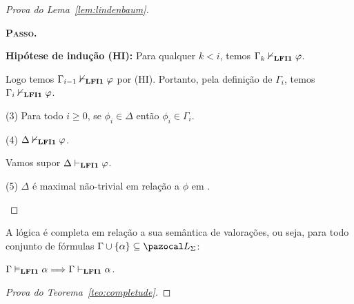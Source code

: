 \begin{proof}[Prova do Lema~\ref{lem:lindenbaum}]
\begin{adjustwidth}{1cm}{}
\begin{adjustwidth}{1cm}{}
                \noindent\textbf{\textsc{Passo.}} 
                
                \noindent\textbf{Hipótese de indução (HI):} Para qualquer $k < i$, temos $\Gamma_k \nvdash_{{\normalfont\textbf{LFI1}}{}} \varphi$.
                
                    Logo temos $\Gamma_{i-1} \nvdash_{{\normalfont\textbf{LFI1}}{}} \varphi$ por (HI). Portanto, pela definição de $\Gamma_i$, temos $\Gamma_i \nvdash_{{\normalfont\textbf{LFI1}}{}} \varphi$.
                    
            \end{adjustwidth}

            
            \noindent(3) Para todo $i \geq 0$, se $\phi_i \in \Delta$ então $\phi_i \in \Gamma_i$.



            \noindent(4) $\Delta \nvdash_{{\normalfont\textbf{LFI1}}{}} \varphi$.

                Vamos supor $\Delta \vdash_{{\normalfont\textbf{LFI1}}{}} \varphi$. 

            \noindent(5) $\Delta$ é maximal não-trivial em relação a $\phi$ em \lfium{}.

        \end{adjustwidth}
            
            
        \end{proof}
        
        

    \begin{teorema}[Completude]\label{teo:completude}
        A lógica {\normalfont\lfium{}} é completa em relação a sua semântica de valorações, ou seja, para todo conjunto de fórmulas $\Gamma \cup \{\alpha\} \subseteq \ling{}$:

        \centering
        {\normalfont{} $\Gamma \vDash_{{\normalfont\textbf{LFI1}}{}} \alpha \Longrightarrow \Gamma \vdash_{{\normalfont\textbf{LFI1}}{}} \alpha$.}
    \end{teorema}

    \begin{proof}[Prova do Teorema~\ref{teo:completude}]
 

    \end{proof}


